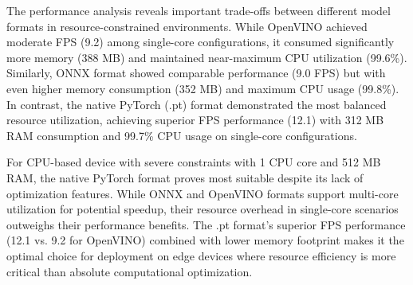 The performance analysis reveals important trade-offs between different model formats in resource-constrained environments. While OpenVINO achieved moderate FPS (9.2) among single-core configurations, it consumed significantly more memory (388 MB) and maintained near-maximum CPU utilization (99.6\%). Similarly, ONNX format showed comparable performance (9.0 FPS) but with even higher memory consumption (352 MB) and maximum CPU usage (99.8\%). In contrast, the native PyTorch (.pt) format demonstrated the most balanced resource utilization, achieving superior FPS performance (12.1) with 312 MB RAM consumption and 99.7\% CPU usage on single-core configurations.

For CPU-based device with severe constraints with 1 CPU core and 512 MB RAM, the native PyTorch format proves most suitable despite its lack of optimization features. While ONNX and OpenVINO formats support multi-core utilization for potential speedup, their resource overhead in single-core scenarios outweighs their performance benefits. The .pt format's superior FPS performance (12.1 vs. 9.2 for OpenVINO) combined with lower memory footprint makes it the optimal choice for deployment on edge devices where resource efficiency is more critical than absolute computational optimization.
